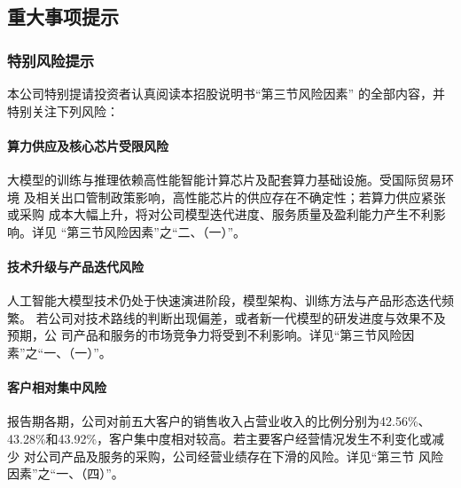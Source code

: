 

\subsection{重大事项提示}

\subsubsection{特别风险提示}

本公司特别提请投资者认真阅读本招股说明书``第三节\hspace{0.5\ccwd}风险因素''
的全部内容，并特别关注下列风险：

\paragraph{算力供应及核心芯片受限风险}
大模型的训练与推理依赖高性能智能计算芯片及配套算力基础设施。受国际贸易环境
及相关出口管制政策影响，高性能芯片的供应存在不确定性；若算力供应紧张或采购
成本大幅上升，将对公司模型迭代进度、服务质量及盈利能力产生不利影响。详见
``第三节\hspace{0.5\ccwd}风险因素''之``二、（一）''。

\paragraph{技术升级与产品迭代风险}
人工智能大模型技术仍处于快速演进阶段，模型架构、训练方法与产品形态迭代频繁。
若公司对技术路线的判断出现偏差，或者新一代模型的研发进度与效果不及预期，公
司产品和服务的市场竞争力将受到不利影响。详见``第三节\hspace{0.5\ccwd}风险因
素''之``一、（一）''。

\paragraph{客户相对集中风险}
报告期各期，公司对前五大客户的销售收入占营业收入的比例分别为42.56\%、
43.28\%和43.92\%，客户集中度相对较高。若主要客户经营情况发生不利变化或减少
对公司产品及服务的采购，公司经营业绩存在下滑的风险。详见``第三节
\hspace{0.5\ccwd}风险因素''之``一、（四）''。

